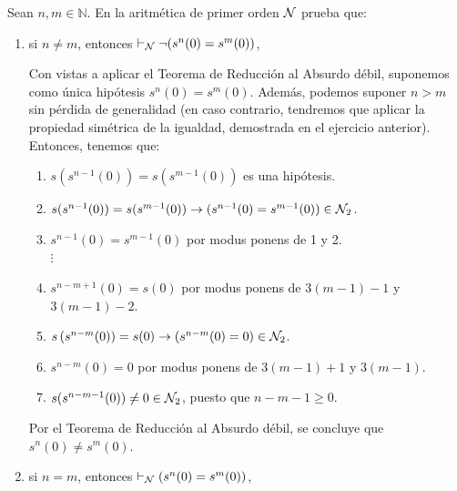 \begin{ejercicio}
    Sean $n, m \in \mathbb{N}$. En la aritmética de primer orden $\mathcal{N}$ prueba que:
    \begin{enumerate}
        \item si $n \neq m$, entonces $\vdash_{\mathcal{N}} \neg (s^n(0) = s^m(0))$,
        
        Con vistas a aplicar el Teorema de Reducción al Absurdo débil, suponemos como única hipótesis $s^n(0) = s^m(0)$. Además, podemos suponer $n>m$ sin pérdida de generalidad (en caso contrario, tendremos que aplicar la propiedad simétrica de la igualdad, demostrada en el ejercicio anterior). Entonces, tenemos que:
        \begin{enumerate}[label=\arabic*.]
            \item $s(s^{n-1}(0)) = s(s^{m-1}(0))$ es una hipótesis.
            \item $s(s^{n-1}(0)) = s(s^{m-1}(0))\to (s^{n-1}(0)=s^{m-1}(0))\in \mathcal{N}_2$.
            \item $s^{n-1}(0)=s^{m-1}(0)$ por modus ponens de 1 y 2.\\
            $\vdots$
            \item [$3(m-1).$] $s^{n-m+1}(0)=s(0)$ por modus ponens de $3(m-1)-1$ y $3(m-1)-2$.
            \item [$3(m-1)+1.$] $s\left(s^{n-m}(0)\right)=s(0)\to \left(s^{n-m}(0)=0\right)\in \mathcal{N}_2$.
            \item [$3(m-1)+2.$] $s^{n-m}(0)=0$ por modus ponens de $3(m-1)+1$ y $3(m-1)$.
            \item [$3m.$] $s(s^{n-m-1}(0))\neq 0\in \mathcal{N}_2$, puesto que $n-m-1\geq 0$.
        \end{enumerate}

        Por el Teorema de Reducción al Absurdo débil, se concluye que $s^n(0) \neq s^m(0)$.\\
        \item si $n = m$, entonces $\vdash_{\mathcal{N}} (s^n(0) = s^m(0))$,
        

\end{enumerate}
\end{ejercicio}
